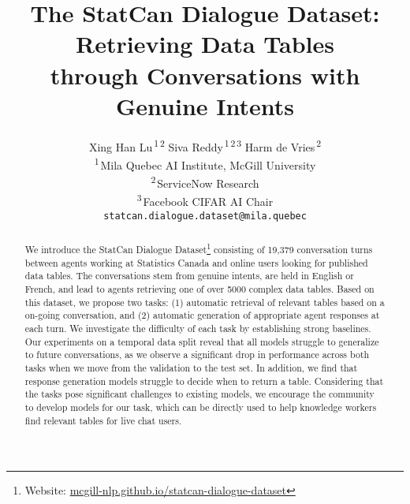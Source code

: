 \documentclass[11pt]{article}
\title{The StatCan Dialogue Dataset: Retrieving Data Tables\\ through Conversations with Genuine Intents}
\author{Xing Han Lu\textsuperscript{\,1\,2} \hspace{3em} Siva Reddy\textsuperscript{\,1\,2\,3} \hspace{3em} Harm de Vries\textsuperscript{\,2} \\
  \textsuperscript{1\,}Mila Quebec AI Institute, McGill University \\
  \textsuperscript{2\,}ServiceNow Research \\
  \textsuperscript{3\,}Facebook CIFAR AI Chair \\
  \texttt{statcan.dialogue.dataset@mila.quebec} \\}
\date{}
\begin{document}
\renewcommand{\sectionautorefname}{Section}
\renewcommand{\subsectionautorefname}{Section}
\renewcommand{\subsubsectionautorefname}{Section}

\maketitle

\def\thefootnote{}\def\thefootnote{\arabic{footnote}}

\begin{abstract}
We introduce the StatCan Dialogue Dataset\footnote{ Website: \href{https://mcgill-nlp.github.io/statcan-dialogue-dataset}{mcgill-nlp.github.io/statcan-dialogue-dataset} } consisting of 19,379 conversation turns between agents working at Statistics Canada and online users looking for published data tables. The conversations stem from genuine intents, are held in English or French, and lead to agents retrieving one of over 5000 complex data tables. Based on this dataset, we propose two tasks: (1) automatic retrieval of relevant tables based on a on-going conversation, and (2) automatic generation of appropriate agent responses at each turn. We investigate the difficulty of each task by establishing strong baselines. Our experiments on a temporal data split reveal that all models struggle to generalize to future conversations, as we observe a significant drop in performance across both tasks when we move from the validation to the test set. In addition, we find that response generation models struggle to decide when to return a table. Considering that the tasks pose significant challenges to existing models, we encourage the community to develop models for our task, which can be directly used to help knowledge workers find relevant tables for live chat users.

\end{abstract}
\end{document}
